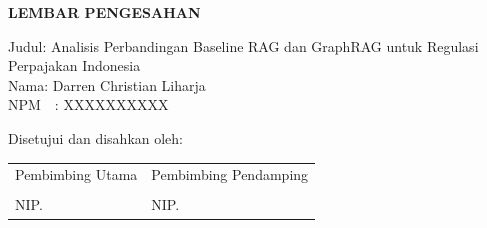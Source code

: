 \thispagestyle{empty}
\begin{center}
  {\bfseries LEMBAR PENGESAHAN\par}
\end{center}
\vspace{1cm}

\noindent Judul\quad : Analisis Perbandingan Baseline RAG dan GraphRAG untuk Regulasi Perpajakan Indonesia\\
\noindent Nama\quad : Darren Christian Liharja\\
\noindent NPM\quad\ \ : XXXXXXXXXX

\vspace{1cm}
\noindent Disetujui dan disahkan oleh:

\vspace{2cm}
\begin{center}
\begin{tabular}{p{6cm} p{6cm}}
\centering Pembimbing Utama & \centering Pembimbing Pendamping \tabularnewline[3cm]
\centering \underline{\hspace{5cm}} & \centering \underline{\hspace{5cm}} \tabularnewline
\centering NIP. & \centering NIP. \tabularnewline
\end{tabular}
\end{center}
